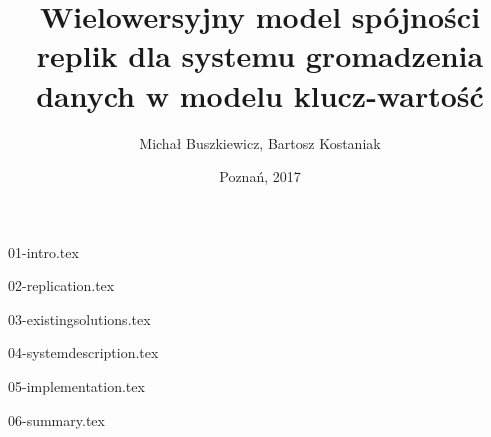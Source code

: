 \documentclass[11pt,a4paper,polish,thesis]{dcsbook}
\begin{document}
\author{Michał Buszkiewicz, Bartosz Kostaniak}
\title{Wielowersyjny model spójności replik dla systemu gromadzenia danych w modelu klucz-wartość}
\date{Poznań, 2017}
\maketitle
\frontmatter
\tableofcontents{}
\mainmatter

{01-intro.tex}

{02-replication.tex}

{03-existingsolutions.tex}

{04-systemdescription.tex}

{05-implementation.tex}


{06-summary.tex}

\backmatter



\end{document}
